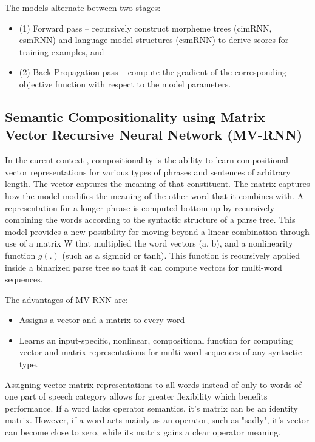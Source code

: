 \documentclass{acm_proc_article-sp}
\begin{document}
The models alternate between two stages:
\begin{itemize} 
\item (1) Forward pass – recursively construct morpheme trees (cimRNN, csmRNN) and language model structures (csmRNN) to derive scores for training examples, and 

\item (2) Back-Propagation pass – compute the gradient of the corresponding objective function with respect to the model parameters.
\end{itemize}

\subsection{Semantic Compositionality using Matrix Vector Recursive Neural Network (MV-RNN)}

In the curent context , compositionality is the ability to learn compositional vector representations for various types of phrases and sentences of arbitrary length. The vector captures the meaning of
that constituent. The matrix captures how the model modifies the meaning of the other word that it combines with. A representation for a longer phrase is computed bottom-up by recursively combining the words according to the syntactic structure of a parse tree. This model provides a new possibility for moving beyond a linear combination through use of a matrix W that multiplied the word vectors (a, b), and a nonlinearity function $g(.)$ (such as a sigmoid or tanh). This function is recursively applied inside a binarized parse tree so that it can compute vectors for multi-word sequences.

The advantages of MV-RNN are:
\begin{itemize}
\item Assigns a vector and a matrix to every word
\item Learns an input-specific, nonlinear, compositional function for computing vector and matrix representations for multi-word sequences of any syntactic type. 
\end{itemize}

Assigning vector-matrix representations to all words instead of only to words of one part of speech category allows for greater flexibility which benefits performance. If a word lacks operator semantics, it's matrix can be an identity matrix. However, if a word acts mainly as an operator, such as "sadly", it's vector can become close to zero, while its matrix gains a clear operator meaning.
\end{document}
